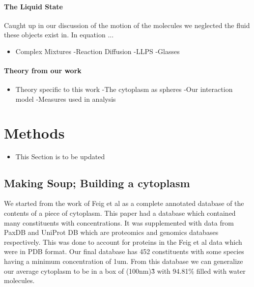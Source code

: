 \documentclass{article}
\begin{document}
\paragraph{The Liquid State}

Caught up in our discussion of the motion of the molecules we neglected the fluid these objects exist in. In equation ...

\begin{itemize}
\item Complex Mixtures \newline
-Reaction Diffusion \newline
-LLPS \newline
-Glasses
\end{itemize}

\paragraph{Theory from our work}

\begin{itemize}
\item Theory specific to this work \newline
-The cytoplasm as spheres \newline
-Our interaction model \newline
-Measures used in analysis
\end{itemize}

\section{Methods}

\begin{itemize}
\item This Section is to be updated
\end{itemize}

\subsection{Making Soup; Building a cytoplasm}

We started from the work of Feig et al as a complete annotated database of the contents of a piece of cytoplasm. This paper had a database which contained many constituents with concentrations. It was supplemented with data from PaxDB and UniProt DB which are proteomics and genomics databases respectively. This was done to account for proteins in the Feig et al data which were in PDB format. Our final database has 452 constituents with some species having a minimum concentration of 1um. From this database we can generalize our average cytoplasm to be in a box of (100nm)\^3 with 94.81\% filled with water molecules.
\end{document}
